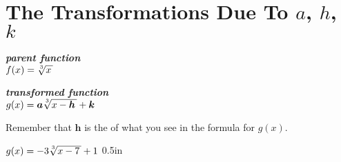 \section{The Transformations Due To $a$, $h$, $k$}

\begin{tcbraster}[
    raster equal height,
    raster left skip = 1in, raster right skip = 1in, 
    raster column skip = 0.5in,
    raster before skip = 1\baselineskip, raster after skip = 1\baselineskip,
    ]
    \begin{tcolorbox}[]
        \centering
        {\bfseries\itshape parent function}\\[0.5\baselineskip]
        \large
        $f(x) = \myRoot[3]{x}$
    \end{tcolorbox}
    \begin{tcolorbox}[]
        \centering
        {\bfseries\itshape transformed function}\\[0.5\baselineskip]
        \large
        $g(x) = \bm{a} \myRoot[3]{x-\bm{h}} + \bm{k}$
    \end{tcolorbox}
\end{tcbraster}

\begin{tcbraster}[]
\end{tcbraster}


Remember that $\bm{h}$ is the  
of what you see in the formula for $g(x)$.



{
    $g(x) = -3\myRoot[3]{x-7} + 1$
}{0.5in}



